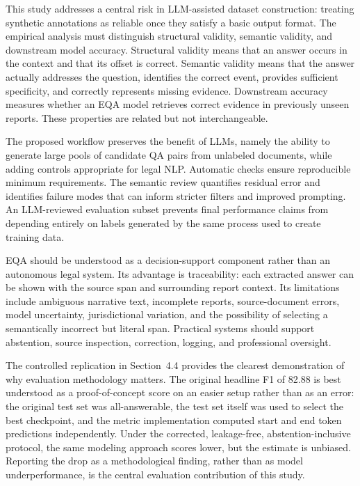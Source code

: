 \documentclass[graybox]{SNmult}
\begin{document}
This study addresses a central risk in LLM-assisted dataset construction: treating synthetic annotations as reliable once they satisfy a basic output format. The empirical analysis must distinguish structural validity, semantic validity, and downstream model accuracy. Structural validity means that an answer occurs in the context and that its offset is correct. Semantic validity means that the answer actually addresses the question, identifies the correct event, provides sufficient specificity, and correctly represents missing evidence. Downstream accuracy measures whether an EQA model retrieves correct evidence in previously unseen reports. These properties are related but not interchangeable.

The proposed workflow preserves the benefit of LLMs, namely the ability to generate large pools of candidate QA pairs from unlabeled documents, while adding controls appropriate for legal NLP. Automatic checks ensure reproducible minimum requirements. The semantic review quantifies residual error and identifies failure modes that can inform stricter filters and improved prompting. An LLM-reviewed evaluation subset prevents final performance claims from depending entirely on labels generated by the same process used to create training data.

EQA should be understood as a decision-support component rather than an autonomous legal system. Its advantage is traceability: each extracted answer can be shown with the source span and surrounding report context. Its limitations include ambiguous narrative text, incomplete reports, source-document errors, model uncertainty, jurisdictional variation, and the possibility of selecting a semantically incorrect but literal span. Practical systems should support abstention, source inspection, correction, logging, and professional oversight.

The controlled replication in Section~4.4 provides the clearest demonstration of why evaluation methodology matters. The original headline F1 of 82.88 is best understood as a proof-of-concept score on an easier setup rather than as an error: the original test set was all-answerable, the test set itself was used to select the best checkpoint, and the metric implementation computed start and end token predictions independently. Under the corrected, leakage-free, abstention-inclusive protocol, the same modeling approach scores lower, but the estimate is unbiased. Reporting the drop as a methodological finding, rather than as model underperformance, is the central evaluation contribution of this study.
\end{document}
